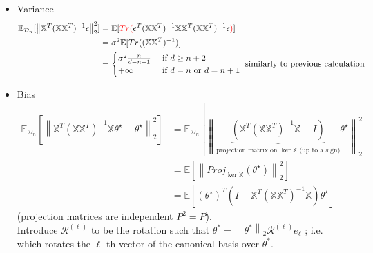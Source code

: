 \begin{itemize}
    \item Variance 
    \begin{align*}
        \mathbb{E}_{\mathcal{D}_n} [ \left\| \mathbb{X}^T (\mathbb{X} \mathbb{X}^T)^{-1} \epsilon  \right\| _2 ^2 ] 
            &= \mathbb{E}[ \textcolor{red}{Tr(} \epsilon ^T (\mathbb{X} \mathbb{X}^T )^{-1} \mathbb{X} \mathbb{X}^T (\mathbb{X} \mathbb{X}^T)^{-1} \epsilon \textcolor{red}{)} ] \\
            &= \sigma ^2 \mathbb{E}[ Tr ((\mathbb{X} \mathbb{X}^T)^{-1})] \\
            &= \begin{cases}
                \sigma ^2 \frac{n}{d - n - 1} &\text{ if } d \geq n+2 \\
                +\infty &\text{ if } d = n \text{ or } d = n+1 \\
            \end{cases} \text{ similarly to previous calculation}
    \end{align*}
    \item Bias
    \begin{align*}
        \mathbb{E}_{\mathcal{D}_n} [ \left\| \mathbb{X}^T (\mathbb{X} \mathbb{X}^T)^{-1} \mathbb{X} \theta ^\star - \theta ^\star  \right\| _2 ^2 ]
            &= \mathbb{E}_{\mathcal{D}_n} [ \left\| \underbrace{(\mathbb{X}^T (\mathbb{X} \mathbb{X}^T)^{-1} \mathbb{X} - I)}_{\text{projection matrix on } \ker \mathbb{X} \text{ (up to a sign)}} \theta ^\star  \right\| _2 ^2 ] \\
            &= \mathbb{E} [ \left\| Proj _{\ker \mathbb{X}} (\theta ^\star ) \right\| _2 ^2 ] \\
            &= \mathbb{E}[(\theta ^\star )^T(I - \mathbb{X}^T(\mathbb{X}\mathbb{X}^T)^{-1} \mathbb{X}) \theta ^\star ]
    \end{align*}
    (projection matrices are independent $P^2 = P$). \\
    Introduce $\mathcal{R}^{(\ell )}$ to be the rotation such that $\theta ^\ast = \left\| \theta ^\ast  \right\|_2 \mathcal{R}^{(\ell )} e_\ell$ ; i.e. which rotates the $\ell $-th vector of the canonical basis over $\theta ^\ast $.


\end{itemize}
